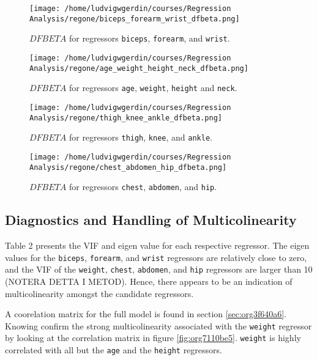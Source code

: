 \documentclass[11pt]{article}
\begin{document}
\begin{figure}[h]
\centering
\texttt{[image: /home/ludvigwgerdin/courses/Regression Analysis/regone/biceps\_forearm\_wrist\_dfbeta.png]}
\caption{\label{fig:org5dc4fde}
\(DFBETA\) for regressors \texttt{biceps}, \texttt{forearm}, and \texttt{wrist}.}
\end{figure}

\begin{figure}[h]
\centering
\texttt{[image: /home/ludvigwgerdin/courses/Regression Analysis/regone/age\_weight\_height\_neck\_dfbeta.png]}
\caption{\label{fig:org74e749f}
\(DFBETA\) for regressors \texttt{age}, \texttt{weight}, \texttt{height} and \texttt{neck}.}
\end{figure}

\begin{figure}[h]
\centering
\texttt{[image: /home/ludvigwgerdin/courses/Regression Analysis/regone/thigh\_knee\_ankle\_dfbeta.png]}
\caption{\label{fig:orgc59b513}
\(DFBETA\) for regressors \texttt{thigh}, \texttt{knee}, and \texttt{ankle}.}
\end{figure}

\begin{figure}[h]
\centering
\texttt{[image: /home/ludvigwgerdin/courses/Regression Analysis/regone/chest\_abdomen\_hip\_dfbeta.png]}
\caption{\label{fig:org957c0dd}
\(DFBETA\) for regressors \texttt{chest}, \texttt{abdomen}, and \texttt{hip}.}
\end{figure}

\subsection{Diagnostics and Handling of Multicolinearity}
\label{sec:orgc2fff09}

Table 2 presents the VIF and eigen value for each respective regressor. The eigen values for the \texttt{biceps},
\texttt{forearm}, and \texttt{wrist} regressors are relatively close to zero, and the VIF of the \texttt{weight},
\texttt{chest}, \texttt{abdomen}, and \texttt{hip} regressors are larger than 10 (NOTERA DETTA I METOD). Hence, there appears 
to be an indication of multicolinearity amongst the candidate regressors.

A coorelation matrix for the full model is found in section \ref{sec:org3f640a6}. Knowing confirm the strong multicolinearity
associated with the \texttt{weight} regressor by looking at the correlation matrix in figure \ref{fig:org7110be5}. \texttt{weight}
is highly correlated with all but the \texttt{age} and the \texttt{height} regressors.
\end{document}
